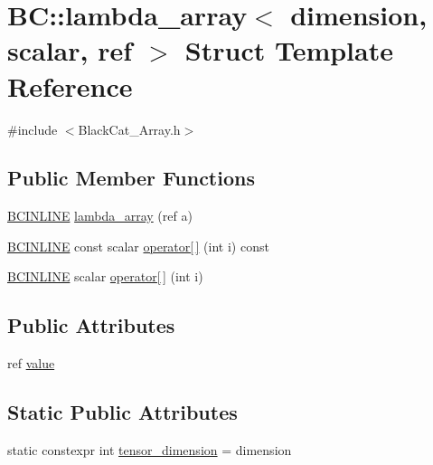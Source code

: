\hypertarget{structBC_1_1lambda__array}{}\section{BC\+:\+:lambda\+\_\+array$<$ dimension, scalar, ref $>$ Struct Template Reference}
\label{structBC_1_1lambda__array}


{\ttfamily \#include $<$Black\+Cat\+\_\+\+Array.\+h$>$}

\subsection*{Public Member Functions}
\begin{DoxyCompactItemize}
\item 
\hyperlink{BlackCat__Common_8h_a6699e8b0449da5c0fafb878e59c1d4b1}{B\+C\+I\+N\+L\+I\+NE} \hyperlink{structBC_1_1lambda__array_aef0c067b208b2f1395e1ac24076c55d5}{lambda\+\_\+array} (ref a)
\item 
\hyperlink{BlackCat__Common_8h_a6699e8b0449da5c0fafb878e59c1d4b1}{B\+C\+I\+N\+L\+I\+NE} const scalar \hyperlink{structBC_1_1lambda__array_ae3ad8502e17fe64c377b7eb51c7f8329}{operator\mbox{[}$\,$\mbox{]}} (int i) const 
\item 
\hyperlink{BlackCat__Common_8h_a6699e8b0449da5c0fafb878e59c1d4b1}{B\+C\+I\+N\+L\+I\+NE} scalar \hyperlink{structBC_1_1lambda__array_a55e3dca5fd5157fe1ebd6220585ba02a}{operator\mbox{[}$\,$\mbox{]}} (int i)
\end{DoxyCompactItemize}
\subsection*{Public Attributes}
\begin{DoxyCompactItemize}
\item 
ref \hyperlink{structBC_1_1lambda__array_ac9e3873e625aa0b47bb46feccea97741}{value}
\end{DoxyCompactItemize}
\subsection*{Static Public Attributes}
\begin{DoxyCompactItemize}
\item 
static constexpr int \hyperlink{structBC_1_1lambda__array_a09096069033267a3e7fa66728312a93c}{tensor\+\_\+dimension} = dimension
\end{DoxyCompactItemize}


